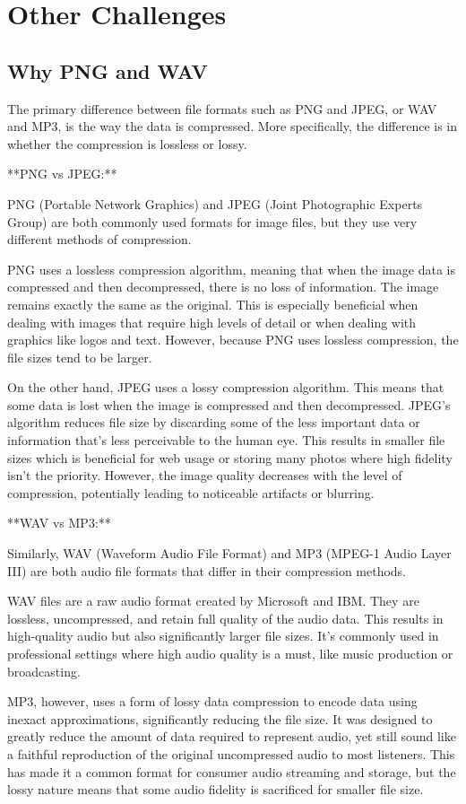 \documentclass{article}
\begin{document}
\section{Other Challenges}
\subsection{Why PNG and WAV}
The primary difference between file formats such as PNG and JPEG, or WAV and MP3, is the way the data is compressed. More specifically, the difference is in whether the compression is lossless or lossy.

**PNG vs JPEG:**

PNG (Portable Network Graphics) and JPEG (Joint Photographic Experts Group) are both commonly used formats for image files, but they use very different methods of compression. 

PNG uses a lossless compression algorithm, meaning that when the image data is compressed and then decompressed, there is no loss of information. The image remains exactly the same as the original. This is especially beneficial when dealing with images that require high levels of detail or when dealing with graphics like logos and text. However, because PNG uses lossless compression, the file sizes tend to be larger.

On the other hand, JPEG uses a lossy compression algorithm. This means that some data is lost when the image is compressed and then decompressed. JPEG's algorithm reduces file size by discarding some of the less important data or information that's less perceivable to the human eye. This results in smaller file sizes which is beneficial for web usage or storing many photos where high fidelity isn't the priority. However, the image quality decreases with the level of compression, potentially leading to noticeable artifacts or blurring.

**WAV vs MP3:**

Similarly, WAV (Waveform Audio File Format) and MP3 (MPEG-1 Audio Layer III) are both audio file formats that differ in their compression methods.

WAV files are a raw audio format created by Microsoft and IBM. They are lossless, uncompressed, and retain full quality of the audio data. This results in high-quality audio but also significantly larger file sizes. It's commonly used in professional settings where high audio quality is a must, like music production or broadcasting.

MP3, however, uses a form of lossy data compression to encode data using inexact approximations, significantly reducing the file size. It was designed to greatly reduce the amount of data required to represent audio, yet still sound like a faithful reproduction of the original uncompressed audio to most listeners. This has made it a common format for consumer audio streaming and storage, but the lossy nature means that some audio fidelity is sacrificed for smaller file size.
\end{document}
